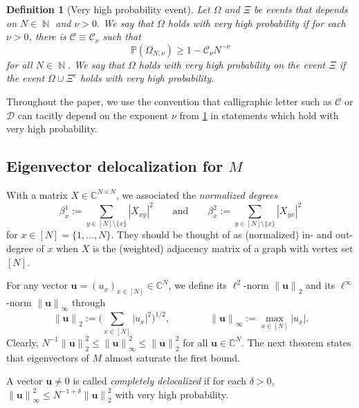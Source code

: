 \documentclass[10pt,a4paper]{amsart}
\DeclareMathOperator{\NN}{\mathbb{N}}
\newcommand{\abs}[1]{\left| #1 \right|}
\newcommand{\norm}[1]{\left\| #1 \right\|}
\newcommand{\C}{\mathbb{C}}
\newtheorem{defi}{Definition}[section]
\numberwithin{equation}{section}
\begin{document}
	\begin{defi}[Very high probability event]\label{def:very_high_probab} 
		Let $\Omega$ and $\Xi$ be events that depends on $N \in \NN$ and $\nu >0$. We say that $\Omega$ holds \emph{with very high probability} if for each $\nu>0$, there is $\mathcal C \equiv \mathcal C_\nu$ such that 
		\[ 
		\mathbb{P}(\Omega_{N,\nu}) \geq 1 - \mathcal C_\nu N^{-\nu} 
		\] 
		for all $N \in \NN$.  We say that $\Omega$ holds \textup{with very high probability on the event} $\Xi$ if the event $\Omega \cup \Xi^{c}$ holds with very high probability.
	\end{defi} 
	Throughout the paper, we use the convention that calligraphic letter such as $\mathcal C$ or $\mathcal D$ can tacitly depend on the exponent $\nu$ from \cref{def:very_high_probab} in statements which hold with very high probability. 
	
	\subsection{Eigenvector delocalization for $M$} 
	
	With a matrix $X \in \C^{N\times N}$, we associated the \emph{normalized degrees} 
	\begin{equation}\label{eq:def_beta_i_x} 
		\beta^1_x:= \sum_{y \in [N]\setminus\{x\}} |X_{xy}|^2 \qquad \text{and} \qquad 	\beta^2_x:= \sum_{y\in [N] \setminus \{ x\}} |X_{yx}|^2
	\end{equation}
	for $x \in [N]=\{1, \ldots, N\}$. 
	They should be thought of as (normalized) in- and out-degree of $x$ when $X$ is the (weighted) adjacency matrix of a graph with vertex set $[N]$. 
	
	For any vector $\mathbf u=(u_x)_{x \in [N]} \in \C^N$, we define its $\ell^2$-norm $\norm{\mathbf u}_2$ and its $\ell^\infty$-norm $\norm{\mathbf u}_\infty$ through 
	\begin{equation} \label{eq:def_vector_norms} 
		\norm{\mathbf u}_2 := \biggl(\sum_{x \in [N]} \abs{u_x}^2\biggr)^{1/2}, \qquad \qquad \norm{\mathbf u}_\infty := \max_{x \in [N]} \abs{u_x}. 
	\end{equation} 
	Clearly, $N^{-1} \norm{\mathbf u}_2^2 \leq \norm{\mathbf u}_\infty^2 \leq \norm{\mathbf u}_2^2$ for all $\mathbf u \in \C^N$. 
	The next theorem states that eigenvectors of $M$ almost saturate the first bound. 
	


	 A vector $\mathbf u \neq 0$ is called \emph{completely delocalized} if for each $\delta>0$, $\norm{\mathbf u}^2_\infty \leq N^{-1 + \delta}\norm{\mathbf u}_2^2$ with very high probability. 
	 
\end{document}
